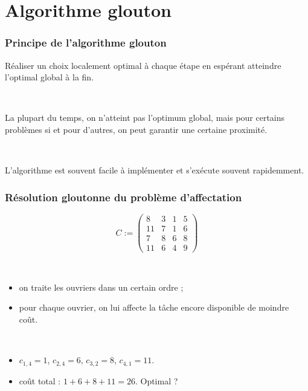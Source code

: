 \documentclass{beamer}
\begin{document}
\section{Algorithme glouton}

\begin{frame}
  \frametitle{Principe de l'algorithme glouton}

  Réaliser un choix localement optimal à chaque étape en espérant atteindre
  l'optimal global à la fin.

  ~
  
  La plupart du temps, on n'atteint pas l'optimum global, mais pour certains
  problèmes si et pour d'autres, on peut garantir une certaine proximité. 

  

  ~
  
  L'algorithme est souvent facile à implémenter et s'exécute souvent rapidemment. 
  
\end{frame}

\begin{frame}
  \frametitle{Résolution gloutonne du problème d'affectation}

  \[
  C := \left(
  \begin{array}{cccc}
    8 & 3 & 1 & 5 \\
    11 & 7 & 1 & 6 \\
    7 & 8 & 6 & 8 \\
    11 & 6 & 4 & 9 
  \end{array}
  \right)
  \]

  ~
  
  \begin{itemize}
  \item on traite les ouvriers dans un certain ordre ; 
  \item pour chaque ouvrier, on lui affecte la tâche encore disponible de moindre coût.
  \end{itemize}

  ~
  
  \begin{itemize}
  \item $c_{1,4} = 1$, $c_{2,4} = 6$, $c_{3,2} = 8$, $c_{4,1} = 11$.
  \item coût total : $1 + 6 + 8 + 11 = 26$. Optimal ?
  \end{itemize}
  
\end{frame}
\end{document}
